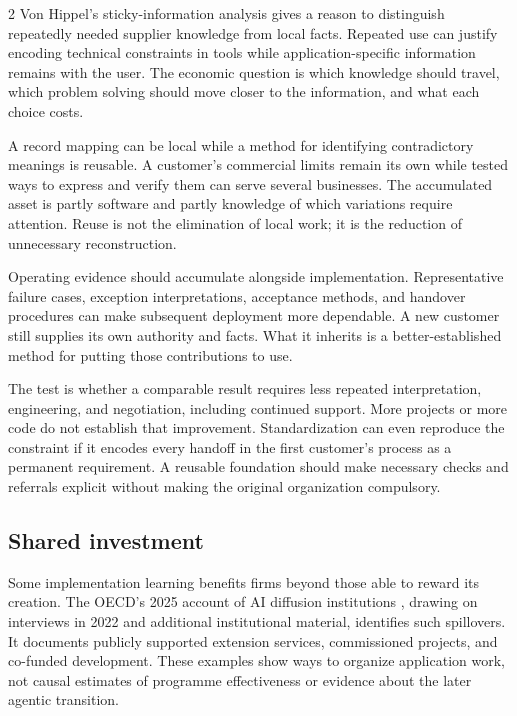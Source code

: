 \begin{multicols}{2}
Von Hippel's sticky-information analysis \citep{vonhippel1994sticky}
gives a reason to distinguish repeatedly needed supplier knowledge from
local facts. Repeated use can justify encoding technical constraints in
tools while application-specific information remains with the user. The
economic question is which knowledge should travel, which problem
solving should move closer to the information, and what each choice
costs.

A record mapping can be local while a method for identifying
contradictory meanings is reusable. A customer's commercial limits
remain its own while tested ways to express and verify them can serve
several businesses. The accumulated asset is partly software and partly
knowledge of which variations require attention. Reuse is not the
elimination of local work; it is the reduction of unnecessary
reconstruction.

Operating evidence should accumulate alongside implementation.
Representative failure cases, exception interpretations, acceptance
methods, and handover procedures can make subsequent deployment more
dependable. A new customer still supplies its own authority and facts.
What it inherits is a better-established method for putting those
contributions to use.

The test is whether a comparable result requires less repeated
interpretation, engineering, and negotiation, including continued
support. More projects or more code do not establish that improvement.
Standardization can even reproduce the constraint if it encodes every
handoff in the first customer's process as a permanent requirement. A
reusable foundation should make necessary checks and referrals explicit
without making the original organization compulsory.

\subsection{Shared investment}\label{shared-investment}

Some implementation learning benefits firms beyond those able to reward
its creation. The OECD's 2025 account of AI diffusion institutions
\citep{oecd2025diffusion}, drawing on interviews in 2022 and additional
institutional material, identifies such spillovers. It documents
publicly supported extension services, commissioned projects, and
co-funded development. These examples show ways to organize application
work, not causal estimates of programme effectiveness or evidence about
the later agentic transition.


\end{multicols}
